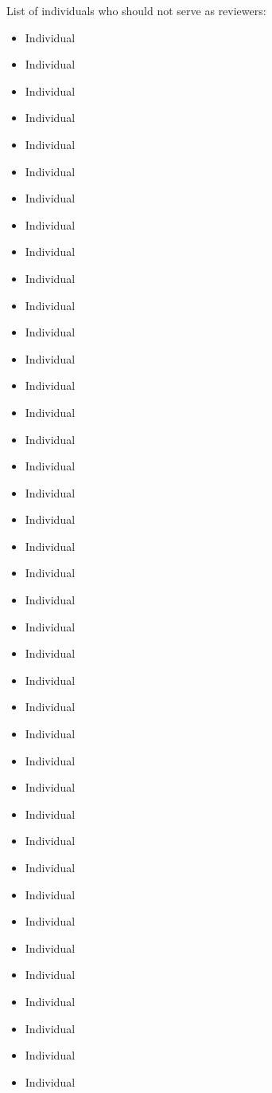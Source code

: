 \noindent List of individuals who should not serve as reviewers:

\begin{multicols}{3}
\begin{itemize}
\item Individual
\item Individual
\item Individual
\item Individual
\item Individual
\item Individual
\item Individual
\item Individual
\item Individual
\item Individual
\item Individual
\item Individual
\item Individual
\item Individual
\item Individual
\item Individual
\item Individual
\item Individual
\item Individual
\item Individual
\item Individual
\item Individual
\item Individual
\item Individual
\item Individual
\item Individual
\item Individual
\item Individual
\item Individual
\item Individual
\item Individual
\item Individual
\item Individual
\item Individual
\item Individual
\item Individual
\item Individual
\item Individual
\item Individual
\item Individual
\end{itemize}
\end{multicols}

